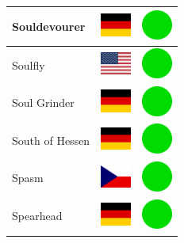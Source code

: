 \documentclass[12pt, a4paper, twoside]{report}
\begin{document}
\begin{center}
\begin{longtable}{|p{5cm}|p{2cm}|p{2cm}|}
 Souldevourer                                               & \includegraphics[width=1cm]{../img/flags/de} &   \includegraphics[width=1cm]{../likes/y} \\ \hline
 Soulfly                                                    & \includegraphics[width=1cm]{../img/flags/us} &   \includegraphics[width=1cm]{../likes/y} \\ \hline
 Soul Grinder                                               & \includegraphics[width=1cm]{../img/flags/de} &   \includegraphics[width=1cm]{../likes/y} \\ \hline
 South of Hessen                                            & \includegraphics[width=1cm]{../img/flags/de} &   \includegraphics[width=1cm]{../likes/y} \\ \hline
 Spasm                                                      & \includegraphics[width=1cm]{../img/flags/cz} &   \includegraphics[width=1cm]{../likes/y} \\ \hline
 Spearhead                                                  & \includegraphics[width=1cm]{../img/flags/de} &   \includegraphics[width=1cm]{../likes/y} \\ \hline

\end{longtable}
\end{center}
\end{document}
